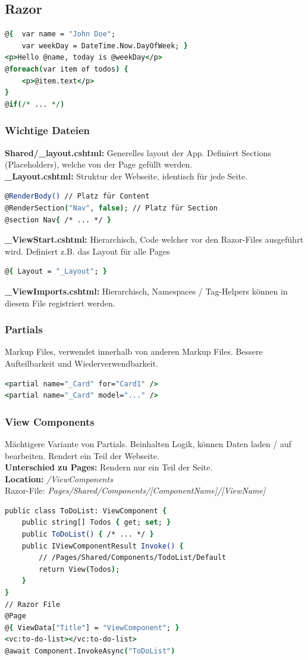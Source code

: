 \subsection{Razor}
\begin{lstlisting}[language=csh]
@{  var name = "John Doe"; 
    var weekDay = DateTime.Now.DayOfWeek; }
<p>Hello @name, today is @weekDay</p>
@foreach(var item of todos) {
    <p>@item.text</p>
}
@if(/* ... */)
\end{lstlisting}

\subsubsection{Wichtige Dateien}
\textbf{Shared/\_layout.cshtml:} Generelles layout der App.
Definiert Sections (Placeholders), welche von der Page gefüllt werden.\\
\textbf{\_Layout.cshtml:} Struktur der Webseite, identisch für jede Seite.
\begin{lstlisting}[language=csh]
@RenderBody() // Platz für Content
@RenderSection("Nav", false); // Platz für Section
@section Nav{ /* ... */ }
\end{lstlisting}
\textbf{\_ViewStart.cshtml:} Hierarchisch, Code welcher vor den Razor-Files ausgeführt wird.
Definiert z.B. das Layout für alle Pages
\begin{lstlisting}[language=csh]
@{ Layout = "_Layout"; }
\end{lstlisting}
\textbf{\_ViewImports.cshtml:} Hierarchisch, Namespaces / Tag-Helpers können in diesem File registriert werden.

\subsubsection{Partials}
Markup Files, verwendet innerhalb von anderen Markup Files. 
Bessere Aufteilbarkeit und Wiederverwendbarkeit.
\begin{lstlisting}[language=csh]
<partial name="_Card" for="Card1" />
<partial name="_Card" model="..." />
\end{lstlisting}

\subsubsection{View Components}
Mächtigere Variante von Partials. 
Beinhalten Logik, können Daten laden / auf bearbeiten.
Rendert ein Teil der Webseite.\\
\textbf{Unterschied zu Pages:} Rendern nur ein Teil der Seite.\\
\textbf{Location:} \textit{/ViewComponents}\\
Razor-File: \textit{Pages/Shared/Components/[ComponentName]/[ViewName]}
\begin{lstlisting}[language=csh]
public class ToDoList: ViewComponent {
    public string[] Todos { get; set; }
    public ToDoList() { /* ... */ }
    public IViewComponentResult Invoke() {
        // /Pages/Shared/Components/TodoList/Default
        return View(Todos);
    }
}
// Razor File
@Page
@{ ViewData["Title"] = "ViewComponent"; }
<vc:to-do-list></vc:to-do-list>
@await Component.InvokeAsync("ToDoList")
\end{lstlisting}

